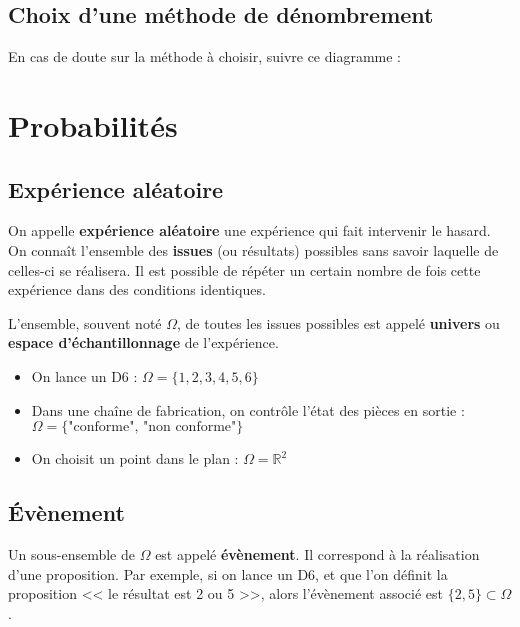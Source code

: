 \subsection{Choix d'une méthode de dénombrement}

En cas de doute sur la méthode à choisir, suivre ce diagramme :
\newline



\section{Probabilités}

\subsection{Expérience aléatoire}

    On appelle \textbf{expérience aléatoire} une expérience qui fait intervenir le hasard. On connaît l’ensemble des \textbf{issues} (ou résultats) possibles sans savoir laquelle de celles-ci se réalisera. Il est possible de répéter un certain nombre de fois cette expérience dans des conditions identiques.

\begin{definition}
    L’ensemble, souvent noté $\Omega$, de toutes les issues possibles est appelé \textbf{univers} ou \textbf{espace d’échantillonnage} de l’expérience.
\end{definition}

\begin{example}
    \begin{itemize}
        \item On lance un D6 : $\Omega = \{1,2,3,4,5,6\}$
        \item Dans une chaîne de fabrication, on contrôle l'état des pièces en sortie : $\Omega = \{\text{"conforme", "non conforme"}\}$
        \item On choisit un point dans le plan : $\Omega = \mathbb{R}^2$
    \end{itemize}
\end{example}

\subsection{Évènement}

Un sous-ensemble de $\Omega$ est appelé \textbf{évènement}. Il correspond à la réalisation d'une proposition. Par exemple, si on lance un D6, et que l'on définit la proposition << le résultat est 2 ou 5 >>, alors l'évènement associé est $\{2,5\} \subset \Omega$.

